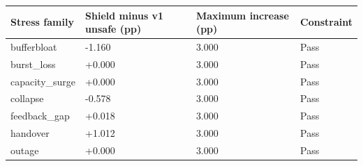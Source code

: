 \begin{tabular}{llll}
\toprule
Stress family & Shield minus v1 unsafe (pp) & Maximum increase (pp) & Constraint \\
\midrule
bufferbloat & -1.160 & 3.000 & Pass \\
burst\_loss & +0.000 & 3.000 & Pass \\
capacity\_surge & +0.000 & 3.000 & Pass \\
collapse & -0.578 & 3.000 & Pass \\
feedback\_gap & +0.018 & 3.000 & Pass \\
handover & +1.012 & 3.000 & Pass \\
outage & +0.000 & 3.000 & Pass \\
\bottomrule
\end{tabular}

